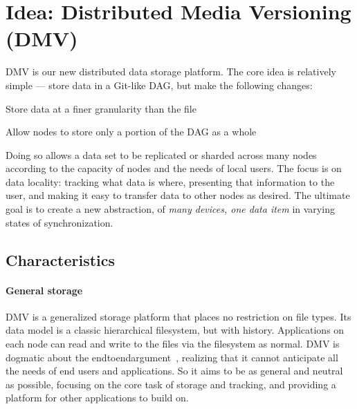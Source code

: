 \chapter{Idea: Distributed Media Versioning (DMV)}


\gls{DMV} is our new distributed data storage platform. The core idea is
relatively simple --- store data in a Git-like \gls{DAG}, but make the following
changes:

\begin{tight_enumerate}

    \item{Store data at a finer granularity than the file}

    \item{Allow nodes to store only a portion of the \gls{DAG} as a whole}

\end{tight_enumerate}

Doing so allows a data set to be replicated or sharded across many nodes
according to the capacity of nodes and the needs of local users. The focus is on
data locality: tracking what data is where, presenting that information to the
user, and making it easy to transfer data to other nodes as desired. The
ultimate goal is to create a new abstraction, of \emph{many devices, one data
item} in varying states of synchronization.

%


\section{Characteristics}
\label{dmv-characteristics}


\subsubsection{General storage}

\gls{DMV} is a generalized storage platform that places no restriction on file
types. Its data model is a classic hierarchical filesystem, but with history.
Applications on each node can read and write to the files via the filesystem as
normal. \gls{DMV} is dogmatic about the
\gls{endtoendargument}~\cite{endtoendargument}, realizing that it cannot
anticipate all the needs of end users and applications. So it aims to be as
general and neutral as possible, focusing on the core task of storage and
tracking, and providing a platform for other applications to build on.


